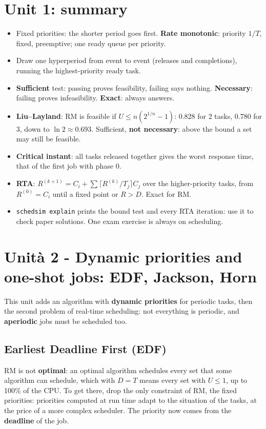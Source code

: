 \section{Unit 1: summary}
\begin{itemize}
    \item Fixed priorities: the shorter period goes first. \textbf{Rate monotonic}: priority $1/T$, fixed, preemptive; one ready queue per priority.
    \item Draw one hyperperiod from event to event (releases and completions), running the highest-priority ready task.
    \item \textbf{Sufficient} test: passing proves feasibility, failing says nothing. \textbf{Necessary}: failing proves infeasibility. \textbf{Exact}: always answers.
    \item \textbf{Liu--Layland}: RM is feasible if $U \le n(2^{1/n} - 1)$: 0.828 for 2 tasks, 0.780 for 3, down to $\ln 2 \approx 0.693$. Sufficient, \textbf{not necessary}: above the bound a set may still be feasible.
    \item \textbf{Critical instant}: all tasks released together gives the worst response time, that of the first job with phase 0.
    \item \textbf{RTA}: $R^{(k+1)} = C_i + \sum \lceil R^{(k)} / T_j \rceil C_j$ over the higher-priority tasks, from $R^{(0)} = C_i$ until a fixed point or $R > D$. Exact for RM.
    \item \texttt{schedsim explain} prints the bound test and every RTA iteration: use it to check paper solutions. One exam exercise is always on scheduling.
\end{itemize}

\section{Unità 2 - Dynamic priorities and one-shot jobs: EDF, Jackson, Horn}
This unit adds an algorithm with \textbf{dynamic priorities} for periodic tasks, then the second problem of real-time scheduling: not everything is periodic, and \textbf{aperiodic} jobs must be scheduled too.

\subsection{Earliest Deadline First (EDF)}
RM is not \textbf{optimal}: an optimal algorithm schedules every set that some algorithm can schedule, which with $D = T$ means every set with $U \le 1$, up to 100\% of the CPU. To get there, drop the only constraint of RM, the fixed priorities: priorities computed at run time adapt to the situation of the tasks, at the price of a more complex scheduler. The priority now comes from the \textbf{deadline} of the job.

